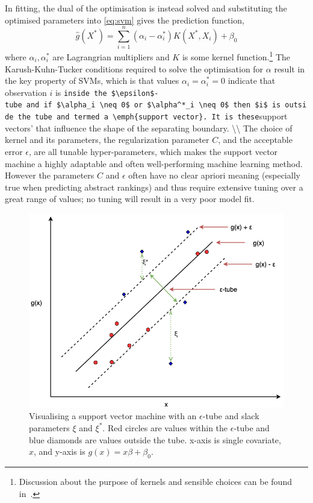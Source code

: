 \documentclass[
  letterpaper,
]{scrbook}
\theoremstyle{plain}
\theoremstyle{definition}
\theoremstyle{remark}
\begin{document}
In fitting, the dual of the optimisation is instead solved and
substituting the optimised parameters into \ref{eq:svm} gives the
prediction function, \[
\hat{g}(X^*) = \sum^n_{i=1} (\alpha_i - \alpha_i^*)K(X^*,X_i) + \beta_0
\] where \(\alpha_i, \alpha_i^*\) are Lagrangrian multipliers and \(K\)
is some kernel
function.\footnote{Discussion about the purpose of kernels and sensible choices can be found in~\cite{pkgsurvivalsvm, Hastie2013, Vapnik1998}.}
The Karush-Kuhn-Tucker conditions required to solve the optimisation for
\(\alpha\) result in the key property of SVMs, which is that values
\(\alpha_i = \alpha_i^* = 0\) indicate that observation \(i\) is
\texttt{inside\textquotesingle{}\ the\ \$\textbackslash{}epsilon\$-tube\ and\ if\ \$\textbackslash{}alpha\_i\ \textbackslash{}neq\ 0\$\ or\ \$\textbackslash{}alpha\^{}*\_i\ \textbackslash{}neq\ 0\$\ then\ \$i\$\ is\ outside\ the\ tube\ and\ termed\ a\ \textbackslash{}emph\{support\ vector\}.\ It\ is\ these}support
vectors' that influence the shape of the separating boundary.
\textbackslash\textbackslash{} The choice of kernel and its parameters,
the regularization parameter \(C\), and the acceptable error
\(\epsilon\), are all tunable hyper-parameters, which makes the support
vector machine a highly adaptable and often well-performing machine
learning method. However the parameters \(C\) and \(\epsilon\) often
have no clear apriori meaning (especially true when predicting abstract
rankings) and thus require extensive tuning over a great range of
values; no tuning will result in a very poor model fit.

\begin{figure}

{\centering \includegraphics{./images/svm/svm.png}

}

\caption{\label{fig-surv-svm}Visualising a support vector machine with
an \(\epsilon\)-tube and slack parameters \(\xi\) and \(\xi^*\). Red
circles are values within the \(\epsilon\)-tube and blue diamonds are
values outside the tube. x-axis is single covariate, \(x\), and y-axis
is \(g(x) = x\beta + \beta_0\).}

\end{figure}
\end{document}

